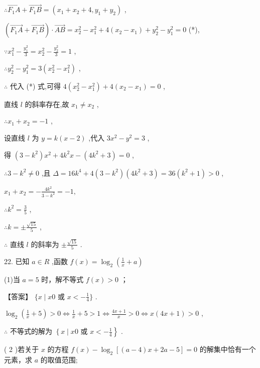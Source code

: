 \documentclass[10pt]{article}
\begin{document}
\(\therefore \overrightarrow{{F}_{1}A} + \overrightarrow{{F}_{1}B} = \left( {{x}_{1} + {x}_{2} + 4,{y}_{1} + {y}_{2}}\right)\) ,

\(\left( {\overrightarrow{{F}_{1}A} + \overrightarrow{{F}_{1}B}}\right)  \cdot  \overrightarrow{AB} = {x}_{2}^{2} - {x}_{1}^{2} + 4\left( {{x}_{2} - {x}_{1}}\right)  + {y}_{2}^{2} - {y}_{1}^{2} = 0\) (*),

\(\because {x}_{1}^{2} - \frac{{y}_{1}^{2}}{3} = {x}_{2}^{2} - \frac{{y}_{2}^{2}}{3} = 1\) ,

\(\therefore {y}_{2}^{2} - {y}_{1}^{2} = 3\left( {{x}_{2}^{2} - {x}_{1}^{2}}\right)\) ,

\(\therefore\) 代入 (*) 式,可得 \(4\left( {{x}_{2}^{2} - {x}_{1}^{2}}\right)  + 4\left( {{x}_{2} - {x}_{1}}\right)  = 0\) ,

直线 \(l\) 的斜率存在,故 \({x}_{1} \neq  {x}_{2}\) ,

\(\therefore {x}_{1} + {x}_{2} =  - 1\) ,

设直线 \(l\) 为 \(y = k\left( {x - 2}\right)\) ,代入 \(3{x}^{2} - {y}^{2} = 3\) ,

得 \(\left( {3 - {k}^{2}}\right) {x}^{2} + 4{k}^{2}x - \left( {4{k}^{2} + 3}\right)  = 0\) ,

\(\therefore 3 - {k}^{2} \neq  0\) ,且 \(\Delta  = {16}{k}^{4} + 4\left( {3 - {k}^{2}}\right) \left( {4{k}^{2} + 3}\right)  = {36}\left( {{k}^{2} + 1}\right)  > 0\) ,

\({x}_{1} + {x}_{2} =  - \frac{4{k}^{2}}{3 - {k}^{2}} =  - 1,\)

\(\therefore {k}^{2} = \frac{3}{5}\) ,

\(\therefore k =  \pm  \frac{\sqrt{15}}{5}\) ,

\(\therefore\) 直线 \(l\) 的斜率为 \(\pm  \frac{\sqrt{15}}{5}\) .

22. 已知 \(a \in  R\) ,函数 \(f\left( x\right)  = {\log }_{2}\left( {\frac{1}{x} + a}\right)\)

(1)当 \(a = 5\) 时，解不等式 \(f\left( x\right)  > 0\) ；

【答案】 \(\{ x \mid  {x0}\) 或 \(x <  - \frac{1}{4}\}\) .

\({\log }_{2}\left( {\frac{1}{x} + 5}\right)  > 0 \Leftrightarrow  \frac{1}{x} + 5 > 1 \Leftrightarrow  \frac{{4x} + 1}{x} > 0 \Leftrightarrow  x\left( {{4x} + 1}\right)  > 0\) ,

\(\therefore\) 不等式的解为 \(\left\{  {x \mid  {x0}}\right.\) 或 \(\left. {x <  - \frac{1}{4}}\right\}\) .

( 2 )若关于 \(x\) 的方程 \(f\left( x\right)  - {\log }_{2}\left\lbrack  {\left( {a - 4}\right) x + {2a} - 5}\right\rbrack   = 0\) 的解集中恰有一个元素，求 \(a\) 的取值范围;
\end{document}
